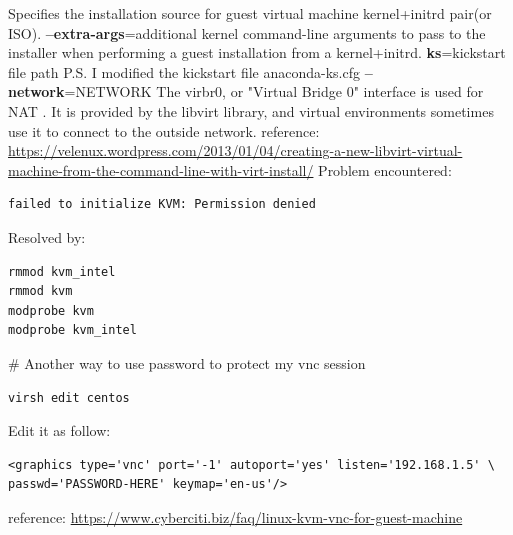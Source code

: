 \documentclass{article}
\begin{document}
    Specifies the installation source for guest virtual machine kernel+initrd pair(or ISO).\newline
    \textbf{--extra-args}=additional kernel command-line arguments to pass to the installer when performing a guest installation from a kernel+initrd.\newline
    \textbf{ks}=kickstart file path\newline
    P.S. I modified the kickstart file anaconda-ks.cfg\newline
    \textbf{--network}=NETWORK\newline
    The virbr0, or "Virtual Bridge 0" interface is used for NAT .\newline
    It is provided by the libvirt library, and virtual environments sometimes use it to connect to the outside network.\newline\newline
reference: \url{https://velenux.wordpress.com/2013/01/04/creating-a-new-libvirt-virtual-machine-from-the-command-line-with-virt-install/}
Problem encountered:
\begin{verbatim}failed to initialize KVM: Permission denied\end{verbatim}
Resolved by:
\begin{verbatim}
rmmod kvm_intel
rmmod kvm
modprobe kvm
modprobe kvm_intel
\end{verbatim}
\# Another way to use password to protect my vnc session
\begin{verbatim}
virsh edit centos
\end{verbatim}
Edit it as follow:
\begin{verbatim}
<graphics type='vnc' port='-1' autoport='yes' listen='192.168.1.5' \
passwd='PASSWORD-HERE' keymap='en-us'/>
\end{verbatim}
reference: \url{https://www.cyberciti.biz/faq/linux-kvm-vnc-for-guest-machine}
\end{document}
